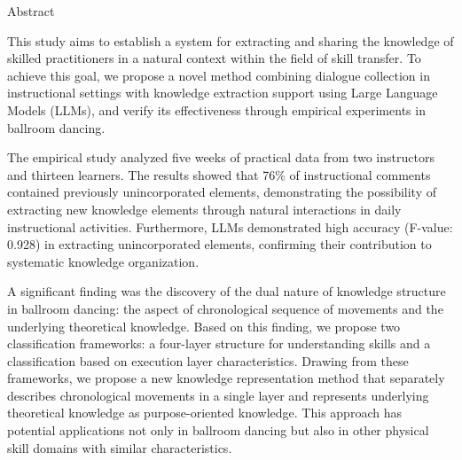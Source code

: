 \centerline{Abstract}
This study aims to establish a system for extracting and sharing the knowledge of skilled practitioners in a natural context within the field of skill transfer. To achieve this goal, we propose a novel method combining dialogue collection in instructional settings with knowledge extraction support using Large Language Models (LLMs), and verify its effectiveness through empirical experiments in ballroom dancing.

The empirical study analyzed five weeks of practical data from two instructors and thirteen learners. The results showed that 76\% of instructional comments contained previously unincorporated elements, demonstrating the possibility of extracting new knowledge elements through natural interactions in daily instructional activities. Furthermore, LLMs demonstrated high accuracy (F-value: 0.928) in extracting unincorporated elements, confirming their contribution to systematic knowledge organization.

A significant finding was the discovery of the dual nature of knowledge structure in ballroom dancing: the aspect of chronological sequence of movements and the underlying theoretical knowledge. Based on this finding, we propose two classification frameworks: a four-layer structure for understanding skills and a classification based on execution layer characteristics. Drawing from these frameworks, we propose a new knowledge representation method that separately describes chronological movements in a single layer and represents underlying theoretical knowledge as purpose-oriented knowledge. This approach has potential applications not only in ballroom dancing but also in other physical skill domains with similar characteristics.
\clearpage